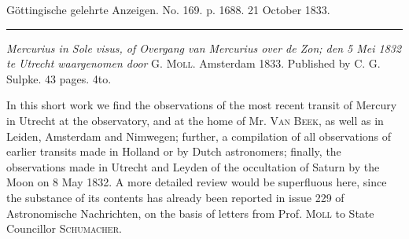 \clearpage
{}
\hypertarget{native-653-lower}{}
\begin{center}\small Göttingische gelehrte Anzeigen. No. 169. p. 1688. 21 October 1833.\\[3pt]\rule{.72\linewidth}{.3pt}\end{center}

\emph{Mercurius in Sole visus, of Overgang van Mercurius over de Zon; den 5 Mei \textup{1832} te Utrecht waargenomen door} G. \textsc{Moll}. Amsterdam 1833. Published by C. G. Sulpke. 43 pages. 4to.

In this short work we find the observations of the most recent transit of Mercury in Utrecht at the observatory, and at the home of Mr. \textsc{Van Beek}, as well as in Leiden, Amsterdam and Nimwegen; further, a compilation of all observations of earlier transits made in Holland or by Dutch astronomers; finally, the observations made in Utrecht and Leyden of the occultation of Saturn by the Moon on 8 May 1832. A more detailed review would be superfluous here, since the substance of its contents has already been reported in issue 229 of Astronomische Nachrichten, on the basis of letters from Prof. \textsc{Moll} to State Councillor \textsc{Schumacher}.
